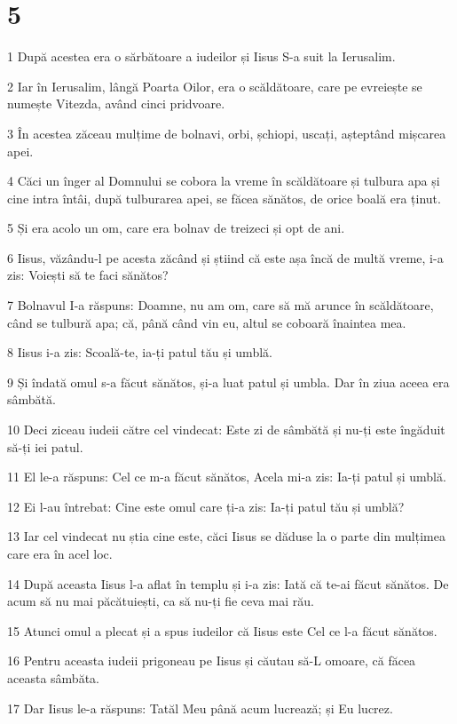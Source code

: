 \chapter{5}

\par 1 După acestea era o sărbătoare a iudeilor și Iisus S-a suit la Ierusalim.
\par 2 Iar în Ierusalim, lângă Poarta Oilor, era o scăldătoare, care pe evreiește se numește Vitezda, având cinci pridvoare.
\par 3 În acestea zăceau mulțime de bolnavi, orbi, șchiopi, uscați, așteptând mișcarea apei.
\par 4 Căci un înger al Domnului se cobora la vreme în scăldătoare și tulbura apa și cine intra întâi, după tulburarea apei, se făcea sănătos, de orice boală era ținut.
\par 5 Și era acolo un om, care era bolnav de treizeci și opt de ani.
\par 6 Iisus, văzându-l pe acesta zăcând și știind că este așa încă de multă vreme, i-a zis: Voiești să te faci sănătos?
\par 7 Bolnavul I-a răspuns: Doamne, nu am om, care să mă arunce în scăldătoare, când se tulbură apa; că, până când vin eu, altul se coboară înaintea mea.
\par 8 Iisus i-a zis: Scoală-te, ia-ți patul tău și umblă.
\par 9 Și îndată omul s-a făcut sănătos, și-a luat patul și umbla. Dar în ziua aceea era sâmbătă.
\par 10 Deci ziceau iudeii către cel vindecat: Este zi de sâmbătă și nu-ți este îngăduit să-ți iei patul.
\par 11 El le-a răspuns: Cel ce m-a făcut sănătos, Acela mi-a zis: Ia-ți patul și umblă.
\par 12 Ei l-au întrebat: Cine este omul care ți-a zis: Ia-ți patul tău și umblă?
\par 13 Iar cel vindecat nu știa cine este, căci Iisus se dăduse la o parte din mulțimea care era în acel loc.
\par 14 După aceasta Iisus l-a aflat în templu și i-a zis: Iată că te-ai făcut sănătos. De acum să nu mai păcătuiești, ca să nu-ți fie ceva mai rău.
\par 15 Atunci omul a plecat și a spus iudeilor că Iisus este Cel ce l-a făcut sănătos.
\par 16 Pentru aceasta iudeii prigoneau pe Iisus și căutau să-L omoare, că făcea aceasta sâmbăta.
\par 17 Dar Iisus le-a răspuns: Tatăl Meu până acum lucrează; și Eu lucrez.
